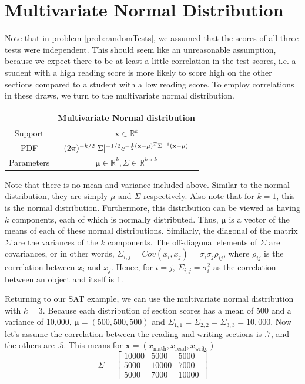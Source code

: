 \section*{Multivariate Normal Distribution}
Note that in problem \ref{prob:randomTests}, we assumed that the scores of all three tests were independent. 
This should seem like an unreasonable assumption, because we expect there to be at least a little correlation in the test scores, 
i.e. a student with a high reading score is more likely to score high on the other sections compared to a student with a low reading score. 
To employ correlations in these draws, we turn to the multivariate normal distribution. 
\begin{table}[h]
\centering
\begin{tabular}{|c|c|}
\hline
&Multivariate Normal distribution  \\ \hline \hline
Support &$\mathbf{x} \in \mathbb{R}^k$ \\ \hline
PDF & $(2\pi)^{-k/2}|\Sigma|^{-1/2}e^{-\frac{1}{2}(\mathbf{x} - \mathbf\mathbf{\mu})^T \Sigma^{-1} (\mathbf{x}-\mathbf{\mu})}$ \\ \hline
 Parameters&$\mathbf{\mu}\in \mathbb{R}^k, \Sigma \in \mathbb{R}^{k\times k}$ \\ \hline
\end{tabular}
\end{table}
Note that there is no mean and variance included above. 
Similar to the normal distribution, they are simply $\mu$ and $\Sigma$ respectively. Also note that for $k=1$, this is the normal distribution.  
Furthermore, this distribution can be viewed as having $k$ components, each of which is normally distributed. 
Thus, $\mathbf{\mu}$ is a vector of the means of each of these normal distributions. 
Similarly, the diagonal of the matrix $\Sigma$ are the variances of the $k$ components. 
The off-diagonal elements of $\Sigma$ are covariances, or in other words, $\Sigma_{i,j} = Cov(x_i,x_j) = \sigma_i \sigma_j \rho_{ij}$, where $\rho_{ij}$ is the correlation between $x_i$ and $x_j$. 
Hence, for $i=j$, $\Sigma_{i,j} = \sigma^2_i$ as the correlation between an object and itself is 1. 

Returning to our SAT example, we can use the multivariate normal distribution with $k=3$. 
Because each distribution of section scores has a mean of 500 and a variance of 10,000, $\mathbf{\mu} = (500,500,500)$ and $\Sigma_{1,1} = \Sigma_{2,2} = \Sigma_{3,3} = 10,000$. 
Now let's assume the correlation between the reading and writing sections is $.7$, and the others are $.5$. 
This means for $\mathbf{x} = (x_{\text{math}},x_{\text{read}},x_{\text{write}})$
\[ \Sigma =  \begin{bmatrix*}
10000 & 5000 & 5000 \\
5000 & 10000 & 7000 \\
5000 & 7000 & 10000 \end{bmatrix*} \]  

